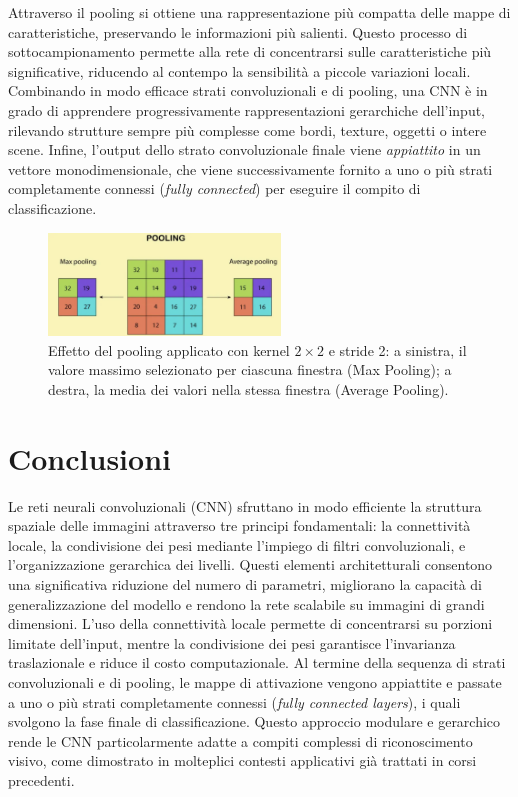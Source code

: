 Attraverso il pooling si ottiene una rappresentazione più compatta delle mappe di caratteristiche, preservando le informazioni più salienti. Questo processo di sottocampionamento permette alla rete di concentrarsi sulle caratteristiche più significative, riducendo al contempo la sensibilità a piccole variazioni locali. Combinando in modo efficace strati convoluzionali e di pooling, una CNN è in grado di apprendere progressivamente rappresentazioni gerarchiche dell’input, rilevando strutture sempre più complesse come bordi, texture, oggetti o intere scene. Infine, l’output dello strato convoluzionale finale viene \textit{appiattito} in un vettore monodimensionale, che viene successivamente fornito a uno o più strati completamente connessi (\textit{fully connected}) per eseguire il compito di classificazione.

\begin{figure}[ht]
    \centering
    \includegraphics[width=0.55\textwidth]{figure/Pooling.png}
    \caption{Effetto del pooling applicato con kernel $2 \times 2$ e stride 2: a sinistra, il valore massimo selezionato per ciascuna finestra (Max Pooling); a destra, la media dei valori nella stessa finestra (Average Pooling).}
    \label{fig:pooling}
\end{figure}

\section{Conclusioni}

Le reti neurali convoluzionali (CNN) sfruttano in modo efficiente la struttura spaziale delle immagini attraverso tre principi fondamentali: la connettività locale, la condivisione dei pesi mediante l’impiego di filtri convoluzionali, e l’organizzazione gerarchica dei livelli. Questi elementi architetturali consentono una significativa riduzione del numero di parametri, migliorano la capacità di generalizzazione del modello e rendono la rete scalabile su immagini di grandi dimensioni. L’uso della connettività locale permette di concentrarsi su porzioni limitate dell’input, mentre la condivisione dei pesi garantisce l’invarianza traslazionale e riduce il costo computazionale. Al termine della sequenza di strati convoluzionali e di pooling, le mappe di attivazione vengono appiattite e passate a uno o più strati completamente connessi (\textit{fully connected layers}), i quali svolgono la fase finale di classificazione. Questo approccio modulare e gerarchico rende le CNN particolarmente adatte a compiti complessi di riconoscimento visivo, come dimostrato in molteplici contesti applicativi già trattati in corsi precedenti.

